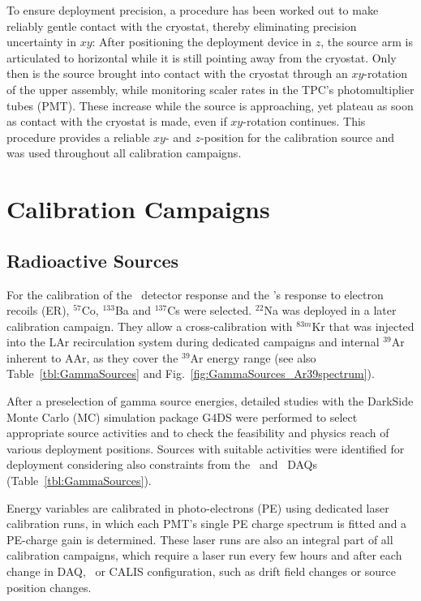 To ensure deployment precision, a procedure has been worked out to make reliably gentle contact with the cryostat, thereby eliminating precision uncertainty in $xy$: After positioning the deployment device in $z$, the source arm is articulated to horizontal while it is still pointing away from the cryostat. Only then is the source brought into contact with the cryostat through an $xy$-rotation of the upper assembly, while monitoring scaler rates in the TPC's photomultiplier tubes (PMT).  These increase while the source is approaching, yet plateau as soon as contact with the cryostat is made, even if $xy$-rotation continues. This procedure provides a reliable $xy$- and $z$-position for the calibration source and was used throughout all calibration campaigns.


\section{Calibration Campaigns}\label{sec:CalibCampaigns}
\subsection{Radioactive Sources}
For the calibration of the \lsv\ detector response and the \tpc's response to electron recoils (ER), $^{57}$Co, $^{133}$Ba and $^{137}$Cs were selected. $^{22}$Na was deployed in a later calibration campaign. They allow a cross-calibration with $^{83m}$Kr that was injected into the LAr recirculation system during dedicated campaigns and internal $^{39}$Ar inherent to AAr, as they cover the $^{39}$Ar energy range (see also Table~\ref{tbl:GammaSources} and Fig.~\ref{fig:GammaSources_Ar39spectrum}). %

After a preselection of gamma source energies, detailed studies with the DarkSide Monte Carlo (MC) simulation package G4DS \cite{DS50:G4DS:paper} were performed to select appropriate source activities and to check the feasibility and physics reach of various deployment positions. Sources with suitable activities were identified for deployment considering also constraints from the \lsv\ and \tpc\ DAQs (Table~\ref{tbl:GammaSources}).

Energy variables are calibrated in photo-electrons (PE) using dedicated laser calibration runs, in which each PMT's single PE charge spectrum is fitted and a PE-charge gain is determined. 
These laser runs are also an integral part of all calibration campaigns, which require a laser run every few hours and after each change in DAQ, \tpc\ or CALIS configuration, such as drift field changes or source position changes.

